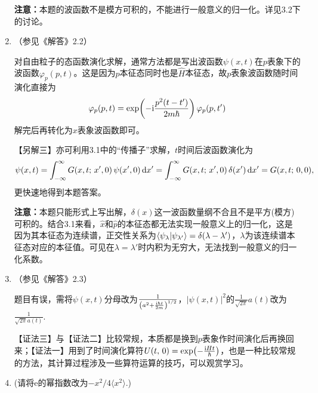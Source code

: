 \begin{enumerate}[label=\textbf{3.\arabic*}, leftmargin=-0.5mm]
\textbf{注意：}本题的波函数不是模方可积的，不能进行一般意义的归一化。详见3.2下的讨论。

\item （参见《解答》2.2）



对自由粒子的态函数演化求解，通常方法都是写出波函数$\psi(x,t)$在$p$表象下的波函数$\varphi_p(p,t)$。这是因为$\hat{p}$本征态同时也是$\hat{H}$本征态，故$p$表象波函数随时间演化直接为
\[\varphi_p(p,t) = \exp(-\mathrm{i}\frac{p^2(t-t')}{2m\hbar})\,\varphi_p(p,t')\]
解完后再转化为$x$表象波函数即可。

【另解三】亦可利用3.1中的“传播子”求解，$t$时间后波函数演化为
\[\psi(x,t) = \int_{-\infty}^\infty G(x,t;\,x',0)\,\psi(x',0) \dd{x'} = \int_{-\infty}^\infty G(x,t;\,x',0)\,\delta(x') \dd{x'} = G(x,t;\,0,0), \]
更快速地得到本题答案。

\textbf{注意：}本题只能形式上写出解，$\delta(x)$这一波函数量纲不合且不是平方(模方)可积的。结合3.1来看，$\hat{x}$和$\hat{p}$的本征态都无法实现一般意义上的归一化，这是因为其本征态为连续谱，正交性关系为$\braket{\psi_{\lambda}}{\psi_{\lambda'}}=\delta(\lambda-\lambda')$，$\lambda$为该连续谱本征态对应的本征值。可见在$\lambda=\lambda'$时内积为无穷大，无法找到一般意义的归一化系数。

\item （参见《解答》2.3）

题目有误，需将$\psi(x,t)$分母改为$\frac{1}{\qty(a^2+\frac{\mathrm{i}\hbar t}{2m})^{1/2}}$，$|\psi(x,t)|^2$的$\frac{1}{\sqrt{2\pi}}a(t)$改为$\frac{1}{\sqrt{2\pi }a(t)}$.

【证法三】与【证法二】比较常规，本质都是换到$p$表象作时间演化后再换回来；【证法一】用到了时间演化算符$U(t,\,0)=\exp(-\frac{\mathrm{i} Ht}{\hbar})$，也是一种比较常规的方法，其计算过程涉及一些算符运算的技巧，可以观赏学习。

\item (请将e的幂指数改为$-x^2/4\langle x^2\rangle$.)


\end{enumerate}
